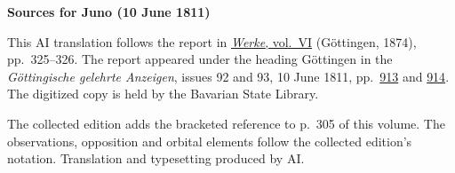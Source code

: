 \clearpage\thispagestyle{empty}
\begin{center}\textbf{Sources for Juno (10 June 1811)}\end{center}
\noindent This AI translation follows the report in \href{https://gdz.sub.uni-goettingen.de/id/PPN236007467}{\textit{Werke}, vol.~VI} (Göttingen, 1874), pp.~325--326. The report appeared under the heading Göttingen in the \textit{Göttingische gelehrte Anzeigen}, issues 92 and 93, 10 June 1811, pp.~\href{https://api.digitale-sammlungen.de/iiif/image/v2/bsb10538679_00949/full/1600,/0/default.jpg}{913} and \href{https://api.digitale-sammlungen.de/iiif/image/v2/bsb10538679_00950/full/1600,/0/default.jpg}{914}. The digitized copy is held by the Bavarian State Library.
\par\smallskip\noindent The collected edition adds the bracketed reference to p.~305 of this volume. The observations, opposition and orbital elements follow the collected edition’s notation. Translation and typesetting produced by AI.
\clearpage
